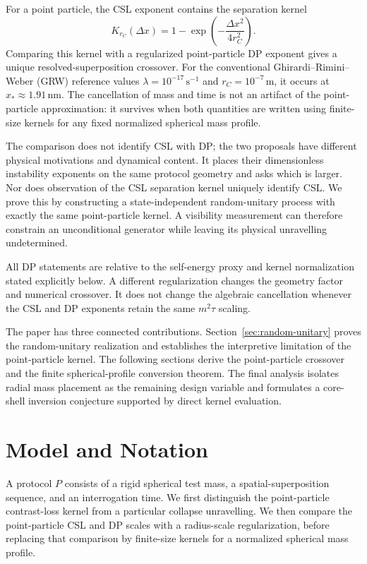 \documentclass[
  aps,
  prd,
  preprint,
  notitlepage,
  superscriptaddress,
  nofootinbib,
  longbibliography
]{revtex4-2}
\newcommand{\dx}{\Delta x}
\newcommand{\Krc}{K_{r_C}}
\begin{document}
For a point particle, the CSL exponent contains the separation kernel
\[
\Krc(\dx)=1-\exp\!\left(-\frac{\dx^2}{4r_C^2}\right).
\]
Comparing this kernel with a regularized point-particle DP exponent gives a unique resolved-superposition crossover. For the conventional Ghirardi--Rimini--Weber (GRW) reference values $\lambda=10^{-17}\,\mathrm{s}^{-1}$ and $r_C=10^{-7}\,\mathrm m$, it occurs at $x_*\approx1.91\,\mathrm{nm}$. The cancellation of mass and time is not an artifact of the point-particle approximation: it survives when both quantities are written using finite-size kernels for any fixed normalized spherical mass profile.

The comparison does not identify CSL with DP; the two proposals have different physical motivations and dynamical content. It places their dimensionless instability exponents on the same protocol geometry and asks which is larger. Nor does observation of the CSL separation kernel uniquely identify CSL. We prove this by constructing a state-independent random-unitary process with exactly the same point-particle kernel. A visibility measurement can therefore constrain an unconditional generator while leaving its physical unravelling undetermined.

All DP statements are relative to the self-energy proxy and kernel normalization stated explicitly below. A different regularization changes the geometry factor and numerical crossover. It does not change the algebraic cancellation whenever the CSL and DP exponents retain the same $m^2\tau$ scaling.

The paper has three connected contributions. Section~\ref{sec:random-unitary} proves the random-unitary realization and establishes the interpretive limitation of the point-particle kernel. The following sections derive the point-particle crossover and the finite spherical-profile conversion theorem. The final analysis isolates radial mass placement as the remaining design variable and formulates a core-shell inversion conjecture supported by direct kernel evaluation.

\section{Model and Notation}
\label{sec:model_and_notation}
A protocol $P$ consists of a rigid spherical test mass, a spatial-superposition sequence, and an interrogation time. We first distinguish the point-particle contrast-loss kernel from a particular collapse unravelling. We then compare the point-particle CSL and DP scales with a radius-scale regularization, before replacing that comparison by finite-size kernels for a normalized spherical mass profile.
\end{document}
